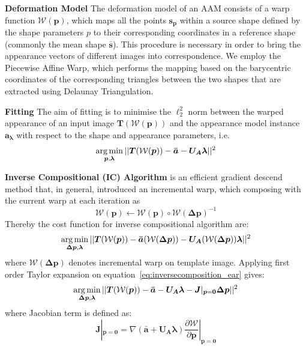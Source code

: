 \noindent\textbf{Deformation Model} The deformation model of an AAM consists of a warp function $\mathcal{W}(\bm{p})$, which maps all the points $\bm{s_p}$ within a source shape defined by the shape parameters $p$ to their corresponding coordinates in a reference shape (commonly the mean shape $\bm{\bar{s}}$). This procedure is necessary in order to bring the appearance vectors of different images into correspondence. We employ the Piecewise Affine Warp, which performs the mapping based on the barycentric coordinates of the corresponding triangles between the two shapes that are extracted using Delaunay Triangulation.

\noindent\textbf{Fitting}
The aim of fitting is to minimise the $\ell_2^2$ norm between the warped appearance of an input image $\bm{T}(\mathcal{W}(\bm{p}))$ and the appearance model instance $\bm{a_\lambda}$ with respect to the shape and appearance parameters, i.e. 
\begin{equation} 
\label{eq:aamfitting_ear}
    \operatorname*{arg\,min}_{\bm{p}, \bm{\lambda}}||\bm{T}(\mathcal{W}(\bm{p}))-\bm{\bar{a}}-\bm{U_A}\bm{\lambda}||^2
\end{equation}



\noindent\textbf{Inverse Compositional (IC) Algorithm} is an efficient gradient descend method that, in general, introduced an incremental warp, which composing with the current warp at each iteration as
\begin{equation}
\label{eq:composition}
\mathcal{W}(\bm{p})\leftarrow\mathcal{W}(\bm{p})\circ\mathcal{W}(\bm{\Delta p})^{-1}
\end{equation}
Thereby the cost function for inverse compositional algorithm are:
\begin{equation}
\label{eq:inversecomposition_ear}
\operatorname*{arg\,min}_{\bm{\Delta p}, \bm{\lambda}}||\bm{T}(\mathcal{W}(\bm{p}))-\bm{\bar{a}}(\mathcal{W}(\bm{\Delta p}))-\bm{U_A}(\mathcal{W}(\bm{\Delta p}))\bm{\lambda}||^2
\end{equation}
where $\mathcal{W}(\bm{\Delta p})$ denotes incremental warp on template image. 
Applying first order Taylor expansion on equation~\ref{eq:inversecomposition_ear} gives:
\begin{equation}
\label{eq:forwardcompositiontaylor-ear}
\operatorname*{arg\,min}_{\bm{\Delta p}, \bm{\lambda}}||\bm{T}(\mathcal{W}(\bm{p}))-\bm{\bar{a}}-\bm{U_A}\bm{\lambda}-\bm{J}|_{\bm{p}=\bm{0}}\bm{\Delta p}||^2
\end{equation}
where Jacobian term is defined as:
\begin{equation}
\label{eq:jacobian}
\bm{J}|_{\bm{p}=\bm{0}}=\nabla(\bm{\bar{a}}+\bm{U_A}\bm{\lambda})\frac{\partial \mathcal{W}}{\partial \bm{p}}|_{\bm{p}=\bm{0}}
\end{equation}




